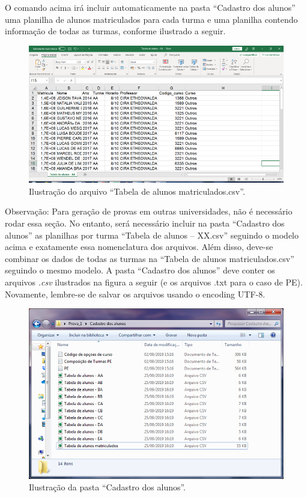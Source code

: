 \documentclass[a4paper]{report}
\begin{document}
O comando acima irá incluir automaticamente na pasta ``Cadastro dos
alunos'' uma planilha de alunos matriculados para cada turma e uma
planilha contendo informação de todas as turmas, conforme ilustrado a
seguir.

\begin{figure}
\centering
\includegraphics{imagens/arquivo_cadastro.png}
\caption{Ilustração do arquivo ``Tabela de alunos matriculados.csv''.}
\end{figure}

Observação: Para geração de provas em outras universidades, não é
necessário rodar essa seção. No entanto, será necessário incluir na
pasta ``Cadastro dos alunos'' as planilhas por turma ``Tabela de alunos
-- XX.csv'' seguindo o modelo acima e exatamente essa nomenclatura dos
arquivos. Além disso, deve-se combinar os dados de todas as turmas na
``Tabela de alunos matriculados.csv'' seguindo o mesmo modelo. A pasta
``Cadastro dos alunos'' deve conter os arquivos \emph{.csv} ilustrados
na figura a seguir (e os arquivos .txt para o caso de PE). Novamente,
lembre-se de salvar os arquivos usando o encoding UTF-8.

\begin{figure}
\centering
\includegraphics{imagens/pasta_cadastroaluno2.png}
\caption{Ilustração da pasta ``Cadastro dos alunos''.}
\end{figure}
\end{document}
